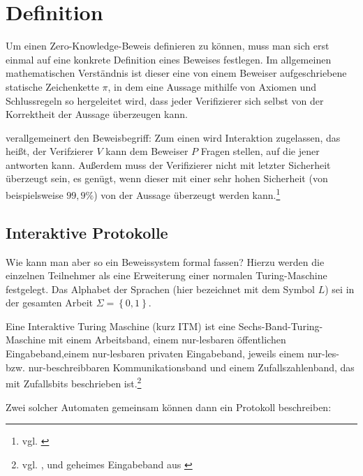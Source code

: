\section{Definition}
Um einen Zero-Knowledge-Beweis definieren zu können, muss man sich erst einmal auf eine konkrete Definition eines Beweises festlegen. Im allgemeinen mathematischen Ver\-ständ\-nis ist dieser eine von einem Beweiser aufgeschriebene statische Zeichenkette \( \pi \), in dem eine Aussage mithilfe von Axiomen und Schlussregeln so hergeleitet wird, dass jeder Verifizierer sich selbst von der Korrektheit der Aussage überzeugen kann.

\cite{goldwasser1989} verallgemeinert den Beweisbegriff: Zum einen wird Interaktion zugelassen, das heißt, der Verifzierer \( V \) kann dem Beweiser \( P \) Fragen stellen, auf die jener antworten kann. Außerdem muss der Verifizierer nicht mit letzter Sicherheit überzeugt sein, es genügt, wenn dieser mit einer sehr hohen Sicherheit (von beispielsweise \( 99,9  \% \)) von der Aussage überzeugt werden kann.\footnote{vgl. \cite[Seite 2]{princeton}}
 
\subsection{Interaktive Protokolle}

Wie kann man aber so ein Beweissystem formal fassen? Hierzu werden die einzelnen Teilnehmer als eine Erweiterung einer normalen Turing-Maschine festgelegt. Das Alphabet der Sprachen (hier bezeichnet mit  dem Symbol \( L \)) sei in der gesamten Arbeit \( \Sigma = \left\lbrace 0, 1 \right\rbrace \).

\vspace{0.2cm}

\begin{definition}
Eine Interaktive Turing Maschine (kurz ITM) ist eine Sechs-Band-Turing-Maschine mit einem \textnormal{Arbeitsband}, einem nur-lesbaren \glqq{}öffentlichen\grqq{} \textnormal{Eingabeband},einem nur-lesbaren \glqq{}privaten\grqq{} Eingabeband, jeweils einem nur-les- bzw. nur-beschreibbaren \textnormal{Kommunikationsband} und einem \textnormal{Zufallszahlenband}, das mit Zufallsbits beschrieben ist.\footnote{vgl. \cite[Definition 1.1]{np}, \cite[Abschnitt 2.1]{goldwasser1989} und geheimes Eingabeband aus \cite[Chapter 2]{identity}}
\end{definition}

Zwei solcher Automaten gemeinsam können dann ein Protokoll beschreiben:

